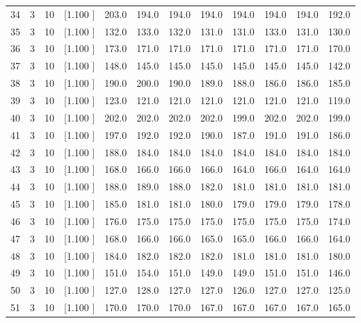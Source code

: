 \documentclass[12pt,a4paper]{article}
\begin{document}
\begin{center}
{\begin{tabular}{r r r r r r r r r r r r}
  34&  3& 10&[1.100     ]&   203.0&   194.0&   194.0&   194.0&   194.0&   194.0&   194.0&   192.0\\[-0.02in]
  35&  3& 10&[1.100     ]&   132.0&   133.0&   132.0&   131.0&   131.0&   133.0&   131.0&   130.0\\[-0.02in]
  36&  3& 10&[1.100     ]&   173.0&   171.0&   171.0&   171.0&   171.0&   171.0&   171.0&   170.0\\[-0.02in]
  37&  3& 10&[1.100     ]&   148.0&   145.0&   145.0&   145.0&   145.0&   145.0&   145.0&   142.0\\[-0.02in]
  38&  3& 10&[1.100     ]&   190.0&   200.0&   190.0&   189.0&   188.0&   186.0&   186.0&   185.0\\[-0.02in]
  39&  3& 10&[1.100     ]&   123.0&   121.0&   121.0&   121.0&   121.0&   121.0&   121.0&   119.0\\[-0.02in]
  40&  3& 10&[1.100     ]&   202.0&   202.0&   202.0&   202.0&   199.0&   202.0&   202.0&   199.0\\[-0.02in]
  41&  3& 10&[1.100     ]&   197.0&   192.0&   192.0&   190.0&   187.0&   191.0&   191.0&   186.0\\[-0.02in]
  42&  3& 10&[1.100     ]&   188.0&   184.0&   184.0&   184.0&   184.0&   184.0&   184.0&   184.0\\[-0.02in]
  43&  3& 10&[1.100     ]&   168.0&   166.0&   166.0&   166.0&   164.0&   166.0&   164.0&   164.0\\[-0.02in]
  44&  3& 10&[1.100     ]&   188.0&   189.0&   188.0&   182.0&   181.0&   181.0&   181.0&   181.0\\[-0.02in]
  45&  3& 10&[1.100     ]&   185.0&   181.0&   181.0&   180.0&   179.0&   179.0&   179.0&   178.0\\[-0.02in]
  46&  3& 10&[1.100     ]&   176.0&   175.0&   175.0&   175.0&   175.0&   175.0&   175.0&   174.0\\[-0.02in]
  47&  3& 10&[1.100     ]&   168.0&   166.0&   166.0&   165.0&   165.0&   166.0&   166.0&   164.0\\[-0.02in]
  48&  3& 10&[1.100     ]&   184.0&   182.0&   182.0&   182.0&   181.0&   181.0&   181.0&   180.0\\[-0.02in]
  49&  3& 10&[1.100     ]&   151.0&   154.0&   151.0&   149.0&   149.0&   151.0&   151.0&   146.0\\[-0.02in]
  50&  3& 10&[1.100     ]&   127.0&   128.0&   127.0&   127.0&   126.0&   127.0&   127.0&   125.0\\[-0.02in]
  51&  3& 10&[1.100     ]&   170.0&   170.0&   170.0&   167.0&   167.0&   167.0&   167.0&   165.0\\[-0.02in]

\end{tabular}}
\end{center}
\end{document}
